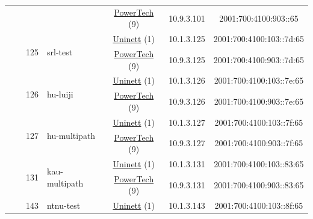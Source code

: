 \begin{small}
\begin{center}
\begin{longtable}{|c|c|c|c|c|c|c|c|}
  &  & \multicolumn{2}{|c|}{} & \multicolumn{2}{|c|}{\tiny{\href{http://www.powertech.no}{PowerTech} (9)}} & \tiny{10.9.3.101} & \tiny{2001:700:4100:903::65} \\* \cline{3-3}\cline{4-4}\cline{5-5}\cline{6-6}\cline{7-7}\cline{8-8}
  &  & \multirow{2}{*}{\tiny{125}} & \multicolumn{1}{|l|}{\multirow{2}{*}{\tiny{srl-test}}} & \multicolumn{2}{|c|}{\tiny{\href{https://www.uninett.no}{Uninett} (1)}} & \tiny{10.1.3.125} & \tiny{2001:700:4100:103::7d:65} \\* \cline{5-5}\cline{6-6}\cline{7-7}\cline{8-8}
  &  &  &  & \multicolumn{2}{|c|}{\tiny{\href{http://www.powertech.no}{PowerTech} (9)}} & \tiny{10.9.3.125} & \tiny{2001:700:4100:903::7d:65} \\* \cline{3-3}\cline{4-4}\cline{5-5}\cline{6-6}\cline{7-7}\cline{8-8}
  &  & \multirow{2}{*}{\tiny{126}} & \multicolumn{1}{|l|}{\multirow{2}{*}{\tiny{hu-luiji}}} & \multicolumn{2}{|c|}{\tiny{\href{https://www.uninett.no}{Uninett} (1)}} & \tiny{10.1.3.126} & \tiny{2001:700:4100:103::7e:65} \\* \cline{5-5}\cline{6-6}\cline{7-7}\cline{8-8}
  &  &  &  & \multicolumn{2}{|c|}{\tiny{\href{http://www.powertech.no}{PowerTech} (9)}} & \tiny{10.9.3.126} & \tiny{2001:700:4100:903::7e:65} \\* \cline{3-3}\cline{4-4}\cline{5-5}\cline{6-6}\cline{7-7}\cline{8-8}
  &  & \multirow{2}{*}{\tiny{127}} & \multicolumn{1}{|l|}{\multirow{2}{*}{\tiny{hu-multipath}}} & \multicolumn{2}{|c|}{\tiny{\href{https://www.uninett.no}{Uninett} (1)}} & \tiny{10.1.3.127} & \tiny{2001:700:4100:103::7f:65} \\* \cline{5-5}\cline{6-6}\cline{7-7}\cline{8-8}
  &  &  &  & \multicolumn{2}{|c|}{\tiny{\href{http://www.powertech.no}{PowerTech} (9)}} & \tiny{10.9.3.127} & \tiny{2001:700:4100:903::7f:65} \\* \cline{3-3}\cline{4-4}\cline{5-5}\cline{6-6}\cline{7-7}\cline{8-8}
  &  & \multirow{2}{*}{\tiny{131}} & \multicolumn{1}{|l|}{\multirow{2}{*}{\tiny{kau-multipath}}} & \multicolumn{2}{|c|}{\tiny{\href{https://www.uninett.no}{Uninett} (1)}} & \tiny{10.1.3.131} & \tiny{2001:700:4100:103::83:65} \\* \cline{5-5}\cline{6-6}\cline{7-7}\cline{8-8}
  &  &  &  & \multicolumn{2}{|c|}{\tiny{\href{http://www.powertech.no}{PowerTech} (9)}} & \tiny{10.9.3.131} & \tiny{2001:700:4100:903::83:65} \\* \cline{3-3}\cline{4-4}\cline{5-5}\cline{6-6}\cline{7-7}\cline{8-8}
  &  & \multirow{2}{*}{\tiny{143}} & \multicolumn{1}{|l|}{\multirow{2}{*}{\tiny{ntnu-test}}} & \multicolumn{2}{|c|}{\tiny{\href{https://www.uninett.no}{Uninett} (1)}} & \tiny{10.1.3.143} & \tiny{2001:700:4100:103::8f:65} \\* \cline{5-5}\cline{6-6}\cline{7-7}\cline{8-8}

\end{longtable}
\end{center}
\end{small}
